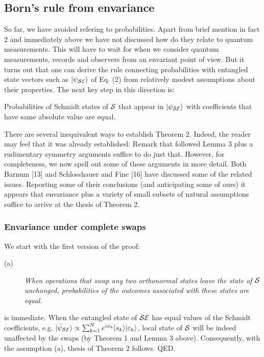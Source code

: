 \documentclass[aps,pra,epsfig,11pt,floatfix]{revtex4}
\begin{document}
\subsection{Born's rule from envariance}

So far, we have avoided refering to probabilities. Apart from brief mention
in fact 2 and immediately above we have not discussed how do they relate to
quantum measurements. This will have to wait for when we consider quantum
measurements, records and observers from an envariant point of view. But it
turns out that one can derive the rule connecting probabilities with entangled
state vectors such as $|\psi_{\cal SE}\rangle$ of Eq. (2) from 
relatively modest
assumptions about their properties. The next key step in this direction is:

 Probabilities of Schmidt states of ${\cal S}$ that
appear in $|\psi_{\cal SE}\rangle$ with coefficients that have same absolute
value are equal.

There are several inequivalent ways to establish Theorem 2. Indeed, the reader
may feel that it was already established: Remark that followed Lemma 3 plus
a rudimentary symmetry arguments suffice to do just that. However,
for completeness, we now spell out some of these arguments in more detail.
Both Barnum [13] and Schlosshauer and Fine [16] have discussed some of the
related issues. Reporting some of their conclusions (and anticipating some
of ours) it appears that envariance plus a variety of small subsets of natural
assumptions suffice to arrive at the thesis of Theorem 2.

\subsubsection{Envariance under complete swaps}

We start with the first version of the proof:

\begin{description}
\item[(a)] {\it When operations that swap any two orthonormal states leave
the state of ${\cal S}$ unchanged, probabilities of the outcomes associated
with these states are equal.}
\end{description}
 is immediate. When the entangled state of ${\cal SE}$
has equal values of the Schmidt coefficients, e.g. $|\bar \psi_{\cal SE}\rangle
\propto \sum_{k=1}^N e^{i \phi_k} |s_k\rangle |\varepsilon_k\rangle $,
local state of ${\cal S}$ will be indeed unaffected by the swaps (by
Theorem 1 and Lemma 3 above). Consequently, with the assumption (a), thesis
of Theorem 2 follows. QED.
\end{document}
